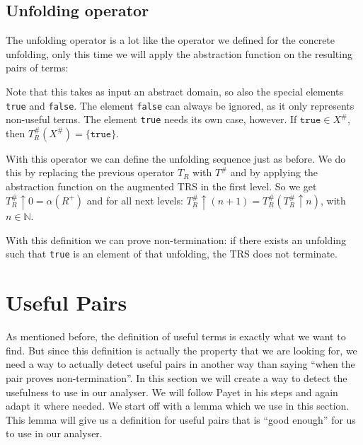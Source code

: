 \subsection*{Unfolding operator}
The unfolding operator is a lot like the operator we defined for the concrete unfolding, only this time we will apply the abstraction function on the resulting pairs of terms:
\begin{center}
\end{center}
Note that this takes as input an abstract domain, so also the special elements \texttt{true} and \texttt{false}. The element \texttt{false} can always be ignored, as it only represents non-useful terms. The element \texttt{true} needs its own case, however. If $\texttt{true} \in X^{\#}$, then $T_R^{\#}(X^{\#}) = \{ \texttt{true} \}$. 

With this operator we can define the unfolding sequence just as before. We do this by replacing the previous operator $T_R$ with $T^{\#}$ and by applying the abstraction function on the augmented TRS in the first level. So we get $T^{\#}_R \uparrow 0 = \alpha(R^+)$ and for all next levels: $T^{\#}_R \uparrow (n+1) = T^{\#}_R(T^{\#}_R \uparrow n)$, with $n \in \mathbb{N}$. 

With this definition we can prove non-termination: if there exists an unfolding such that \texttt{true} is an element of that unfolding, the TRS does not terminate. 

\section*{Useful Pairs}
As mentioned before, the definition of useful terms is exactly what we want to find. But since this definition is actually the property that we are looking for, we need a way to actually detect useful pairs in another way than saying ``when the pair proves non-termination''. In this section we will create a way to detect the usefulness to use in our analyser. We will follow Payet in his steps and again adapt it where needed. We start off with a lemma which we use in this section. This lemma will give us a definition for useful pairs that is ``good enough'' for us to use in our analyser. 

